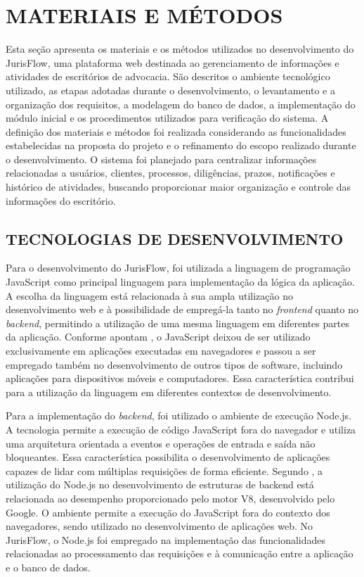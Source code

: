 \chapter{MATERIAIS E MÉTODOS}
Esta seção apresenta os materiais e os métodos utilizados no desenvolvimento do JurisFlow, uma plataforma web destinada ao gerenciamento de informações e atividades de escritórios de advocacia. São descritos o ambiente tecnológico utilizado, as etapas adotadas durante o desenvolvimento, o levantamento e a organização dos requisitos, a modelagem do banco de dados, a implementação do módulo inicial e os procedimentos utilizados para verificação do sistema. A definição dos materiais e métodos foi realizada considerando as funcionalidades estabelecidas na proposta do projeto e o refinamento do escopo realizado durante o desenvolvimento. O sistema foi planejado para centralizar informações relacionadas a usuários, clientes, processos, diligências, prazos, notificações e histórico de atividades, buscando proporcionar maior organização e controle das informações do escritório.

\section{TECNOLOGIAS DE DESENVOLVIMENTO}

Para o desenvolvimento do JurisFlow, foi utilizada a linguagem de programação
JavaScript como principal linguagem para implementação da lógica da aplicação.
A escolha da linguagem está relacionada à sua ampla utilização no desenvolvimento
web e à possibilidade de empregá-la tanto no \textit{frontend} quanto no
\textit{backend}, permitindo a utilização de uma mesma linguagem em diferentes
partes da aplicação. Conforme apontam , o JavaScript deixou de
ser utilizado exclusivamente em aplicações executadas em navegadores e passou a
ser empregado também no desenvolvimento de outros tipos de software, incluindo
aplicações para dispositivos móveis e computadores. Essa característica contribui
para a utilização da linguagem em diferentes contextos de desenvolvimento.

Para a implementação do \textit{backend}, foi utilizado o ambiente de execução
Node.js. A tecnologia permite a execução de código JavaScript fora do navegador
e utiliza uma arquitetura orientada a eventos e operações de entrada e saída não
bloqueantes. Essa característica possibilita o desenvolvimento de aplicações
capazes de lidar com múltiplas requisições de forma eficiente. Segundo , 
a utilização do Node.js no desenvolvimento de estruturas de backend está
relacionada ao desempenho proporcionado pelo motor V8, desenvolvido pelo Google.
O ambiente permite a execução do JavaScript fora do contexto dos navegadores,
sendo utilizado no desenvolvimento de aplicações web. No JurisFlow, o Node.js foi
empregado na implementação das funcionalidades relacionadas ao processamento das
requisições e à comunicação entre a aplicação e o banco de dados.

